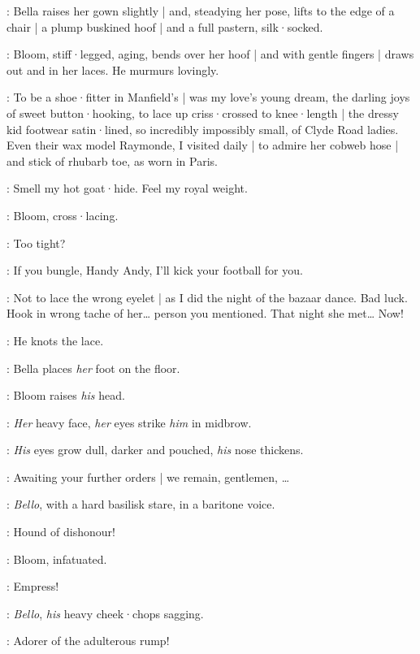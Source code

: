 :
Bella raises her gown slightly |
and,
steadying her pose,
lifts to the edge of a chair |
a plump buskined hoof |
%
and a full pastern,
silk·socked.

:
Bloom,
stiff·legged,
aging,
bends over her hoof |
and with gentle fingers |
draws out and in her laces.
He murmurs lovingly.

\Bloom:
To be a shoe·fitter in Manfield's |
was my love's young dream,
the darling joys of sweet button·hooking,
to lace up criss·crossed to knee·length |
the dressy kid footwear satin·lined,
so incredibly impossibly small,
of Clyde Road ladies.
Even their wax model Raymonde,
I visited daily |
to admire her cobweb hose |
and stick of rhubarb toe,
as worn in Paris.

\Hoof[1b]:
Smell my hot goat·hide.
%
Feel my royal weight.

:
Bloom,
cross·lacing.

\Bloom:
Too tight?

\Hoof:
If you bungle,
Handy Andy,
I'll kick your football for you.

\Bloom:
Not to lace the wrong eyelet |
as I did the night of the bazaar dance.
Bad luck.
Hook in wrong tache of her…
person you mentioned.
That night she met…
Now!

:
He knots the lace.


:
Bella places \emph{her} foot on the floor.

:
Bloom raises \emph{his} head.

:
\emph{Her} heavy face,
\emph{her} eyes strike \emph{him} in midbrow.

:
\emph{His} eyes grow dull,
darker and pouched,
\emph{his} nose thickens.

\Bloom:
Awaiting your further orders |
we remain,
gentlemen,
…

:
\emph{Bello},
with a hard basilisk stare,
in a baritone voice.

\Bello:
Hound of dishonour!

:
Bloom,
infatuated.

\Bloom:
Empress!

:
\emph{Bello},
\emph{his} heavy cheek·chops sagging.

\Bello:
Adorer of the adulterous rump!

